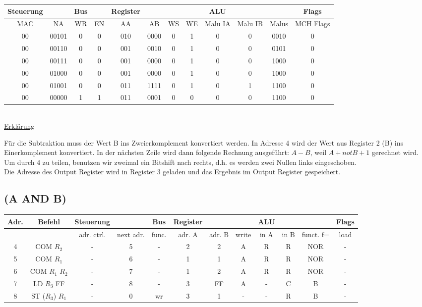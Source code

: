 \documentclass[paper=a4, fontsize=11pt]{scrartcl}
\numberwithin{equation}{section}
\numberwithin{figure}{section}
\numberwithin{table}{section}
\begin{document}
\begin{tabular}{|cc|cc|cccc|ccc|c|}
\hline
Steuerung & & Bus & & Register & & & & ALU & & & Flags \\
\hline
MAC & NA & WR & EN & AA & AB & WS & WE & Malu IA & Malu IB & Malus & MCH Flags \\
\hline
00 & 00101 & 0 & 0 & 010 & 0000 & 0 & 1 & 0 & 0 & 0010 & 0 \\
\hline
00 & 00110 & 0 & 0 & 001 & 0010 & 0 & 1 & 0 & 0 & 0101 & 0 \\
\hline
00 & 00111 & 0 & 0 & 001 & 0000 & 0 & 1 & 0 & 0 & 1000 & 0 \\
\hline
00 & 01000 & 0 & 0 & 001 & 0000 & 0 & 1 & 0 & 0 & 1000 & 0 \\
\hline
00 & 01001 & 0 & 0 & 011 & 1111 & 0 & 1 & 0 & 1 & 1100 & 0 \\
\hline
00 & 00000 & 1 & 1 & 011 & 0001 & 0 & 0 & 0 & 0 & 1100 & 0 \\
\hline
\end{tabular} \\

\underline{Erklärung}

Für die Subtraktion muss der Wert B ins Zweierkomplement konvertiert werden. In Adresse 4 wird der Wert aus Register 2 (B) ins Einerkomplement konvertiert. In der nächsten Zeile wird dann folgende Rechnung ausgeführt: $A-B$, weil $A+ notB +1$ gerechnet wird. Um durch 4 zu teilen, benutzen wir zweimal ein Bitshift nach rechts, d.h. es werden zwei Nullen links eingeschoben. \\
Die Adresse des Output Register wird in Register 3 geladen und das Ergebnis im Output Register gespeichert.


\subsection{(A AND B)}

\begin{tabular}{|c|c|cc|c|ccc|ccc|c|}
\hline
Adr. & Befehl &Steuerung & & Bus & Register & & & ALU & & & Flags \\
\hline
& & adr. ctrl. & next adr. & func. & adr. A & adr. B & write & in A & in B & funct. f= & load \\
\hline
4 & COM $R_{2}$ & - & 5 & - & 2 & 2 & A & R & R & NOR & - \\
\hline
5 & COM $R_{1}$ & - & 6 & - & 1 & 1 & A & R & R & NOR & - \\
\hline
6 & COM $R_{1}$ $R_{2}$ & - & 7 & - & 1 & 2 & A & R & R & NOR & - \\
\hline
7 & LD $R_{3}$ FF & - & 8 & - & 3 & FF & A & - & C & B & - \\
\hline
8 & ST ($R_{3}$) $R_{1}$ & - & 0 & wr & 3 & 1 & - & - & R & B & - \\
\hline
\end{tabular} \\
\end{document}
